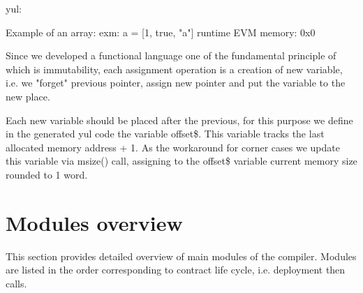 yul:

Example of an array:
exm:
  a = [1, true, "a"]
runtime EVM memory:
  0x0

Since we developed a functional language one of the fundamental principle of which is immutability, each assignment operation is a creation of new variable, i.e. we "forget" previous pointer, assign new pointer and put the variable to the new place.

Each new variable should be placed after the previous, for this purpose we define in the generated yul code the variable offset\$. This variable tracks the last allocated memory address + 1. As the workaround for corner cases we update this variable via msize() call, assigning to the offset\$ variable current memory size rounded to 1 word.


\section{Modules overview}
This section provides detailed overview of main modules of the compiler. Modules are listed in the order corresponding to contract life cycle, i.e. deployment then calls.
